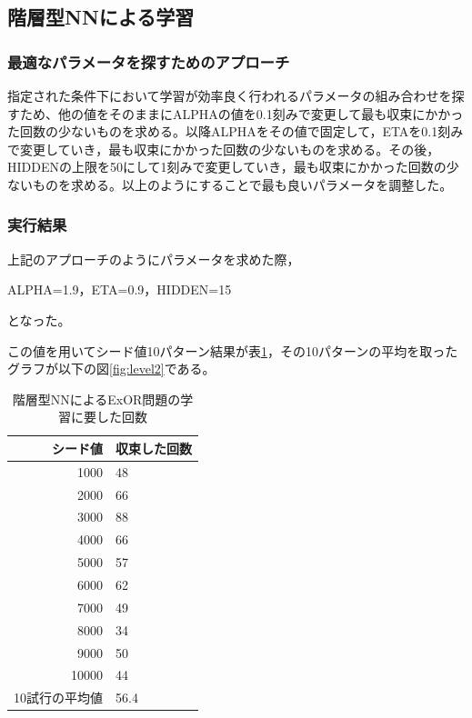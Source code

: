 \subsection{階層型NNによる学習}
\subsubsection{最適なパラメータを探すためのアプローチ}
指定された条件下において学習が効率良く行われるパラメータの組み合わせを探
すため、他の値をそのままにALPHAの値を0.1刻みで変更して最も収束にかかった回数の少ないものを求める。以降ALPHAをその値で固定して，ETAを0.1刻みで変更していき，最も収束にかかった回数の少ないものを求める。その後，HIDDENの上限を50にして1刻みで変更していき，最も収束にかかった回数の少ないものを求める。以上のようにすることで最も良いパラメータを調整した。

\subsubsection{実行結果}
上記のアプローチのようにパラメータを求めた際，

ALPHA=1.9，ETA=0.9，HIDDEN=15

となった。

この値を用いてシード値10パターン結果が表\ref{table:level2}，その10パターンの平均を取ったグラフが以下の図\ref{fig:level2}である。

\begin{table}[htb]
 \begin{center}
  \caption{階層型NNによるExOR問題の学習に要した回数}
  \label{table:level2}
  \begin{tabular}[htb]{r|l} \hline
   シード値 & 収束した回数 \\ \hline \hline
   1000 & 48 \\ \hline
   2000 & 66 \\ \hline
   3000 & 88 \\ \hline
   4000 & 66 \\ \hline
   5000 & 57 \\ \hline
   6000 & 62 \\ \hline
   7000 & 49 \\ \hline
   8000 & 34 \\ \hline
   9000 & 50 \\ \hline
   10000 & 44 \\ \hline \hline
   10試行の平均値 & 56.4 \\ \hline
  \end{tabular}
 \end{center}
\end{table}


